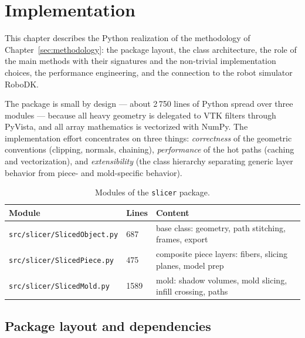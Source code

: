 \section{Implementation}\label{sec:implementation}

This chapter describes the Python realization of the methodology of
Chapter~\ref{sec:methodology}: the package layout, the class
architecture, the role of the main methods with their signatures and
the non-trivial implementation choices, the performance engineering,
and the connection to the robot simulator RoboDK.

The package is small by design --- about 2\,750 lines of Python spread
over three modules --- because all heavy geometry is delegated to VTK
filters through PyVista, and all array mathematics is vectorized with
NumPy. The implementation effort concentrates on three things:
\emph{correctness} of the geometric conventions (clipping, normals,
chaining), \emph{performance} of the hot paths (caching and
vectorization), and \emph{extensibility} (the class hierarchy
separating generic layer behavior from piece- and mold-specific
behavior).

\begin{table}[htbp]
\centering
\begin{tabular}{lll}
\toprule
Module & Lines & Content \\
\midrule
\texttt{src/slicer/SlicedObject.py} & 687 & base class: geometry, path stitching, frames, export \\
\texttt{src/slicer/SlicedPiece.py}  & 475 & composite piece layers: fibers, slicing planes, model prep \\
\texttt{src/slicer/SlicedMold.py}   & 1589 & mold: shadow volumes, mold slicing, infill crossing, paths \\
\bottomrule
\end{tabular}
\caption{Modules of the \texttt{slicer} package.}
\label{tab:modules}
\end{table}

\subsection{Package layout and dependencies}

